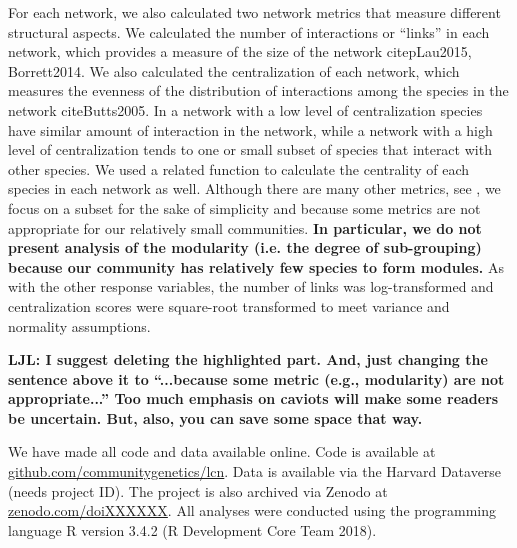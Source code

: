 \documentclass[11pt,twocolumn,twoside,lineno]{pnas-new}
\begin{document}
{For each network, we also calculated two network metrics that measure
different structural aspects. We calculated the number of interactions
or ``links'' in each network, which provides a measure of the size of
the network citep{Lau2015, Borrett2014}. We also calculated the
centralization of each network, which measures the evenness of the
distribution of interactions among the species in the network
cite{Butts2005}. In a network with a low level of centralization
species have similar amount of interaction in the network, while a
network with a high level of centralization tends to one or small
subset of species that interact with other species. We used a related
function to calculate the centrality of each species in each network
as well. Although there are many other metrics, see \citep{Lau2017a},
we focus on a subset for the sake of simplicity and because some
metrics are not appropriate for our relatively small
communities. \textbf{In particular, we do not present analysis of the
  modularity (i.e. the degree of sub-grouping) because our community
  has relatively few species to form modules.} As with the other
response variables, the number of links was log-transformed and
centralization scores were square-root transformed to meet variance
and normality assumptions.

\textbf{LJL: I suggest deleting the highlighted part. And, just
  changing the sentence above it to “...because some metric (e.g.,
  modularity) are not appropriate...”  Too much emphasis on caviots
  will make some readers be uncertain. But, also, you can save some
  space that way.}

We have made all code and data available online. Code is available at
\url{github.com/communitygenetics/lcn}. Data is available via the
Harvard Dataverse (needs project ID). The project is also archived via
Zenodo at \url{zenodo.com/doiXXXXXX}. All analyses were conducted
using the programming language R version 3.4.2 (R Development Core
Team 2018).
}


\end{document}
